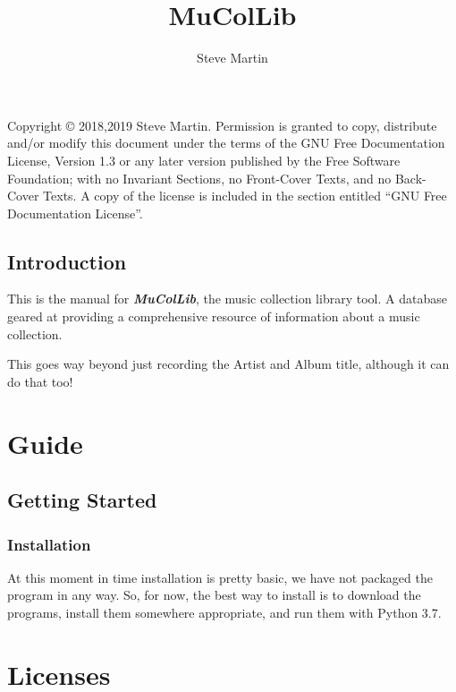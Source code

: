 \documentclass[12pt,a4paper,final,twoside,titlepage]{book}
\author{\LARGE Steve Martin}
\title{\Huge MuColLib}
\begin{document}
\maketitle
\null
\vfill
Copyright \copyright{}  2018,2019  Steve Martin.
Permission is granted to copy, distribute and/or modify this document
under the terms of the GNU Free Documentation License, Version 1.3
or any later version published by the Free Software Foundation;
with no Invariant Sections, no Front-Cover Texts, and no Back-Cover Texts.
A copy of the license is included in the section entitled ``GNU
Free Documentation License''.
\frontmatter
\tableofcontents
\newpage
\chapter{Introduction}
This is the manual for \textbf{\textit{MuColLib}}, the music collection library tool. A database geared at providing a comprehensive resource of information about a music collection.

This goes way beyond just recording the Artist and Album title, although it can do that too!
\mainmatter
\part{Guide}
\chapter{Getting Started}
\section{Installation}
At this moment in time installation is pretty basic, we have not packaged the program in any way.  So, for now, the best way to install is to download the programs, install them somewhere appropriate, and run them with Python 3.7.
\part{Licenses}

\newpage

\end{document}
